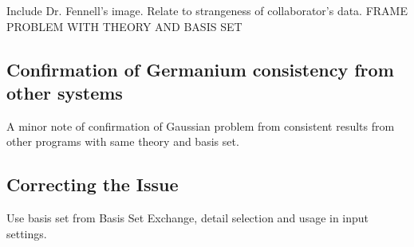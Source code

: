 Include Dr. Fennell's image. Relate to strangeness of collaborator's data. FRAME PROBLEM WITH THEORY AND BASIS SET

\subsection{Confirmation of Germanium consistency from other systems}

A minor note of confirmation of Gaussian problem from consistent results from other programs with same theory and basis set.

\subsection{Correcting the Issue}

Use basis set from Basis Set Exchange, detail selection and usage in input settings.